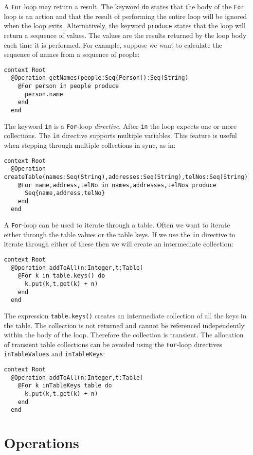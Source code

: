 \documentclass{article}
\begin{document}
A {\tt For} loop may return a result. The keyword {\tt do} states that the body of the
{\tt For} loop is an action and that the result of performing the entire loop will be
ignored when the loop exits. Alternatively, the keyword {\tt produce} states that the
loop will return a sequence of values. The values are the results returned by the loop
body each time it is performed. For example, suppose we want to calculate the sequence
of names from a sequence of people:
\begin{verbatim}
context Root
  @Operation getNames(people:Seq(Person)):Seq(String)
    @For person in people produce 
      person.name 
    end
  end
\end{verbatim}
The keyword {\tt in} is a {\tt For}-loop {\it directive}. After {\tt in} the loop
expects one or more collections. The {\tt in} directive supports multiple variables.
This feature is useful when stepping through multiple collections in sync, as in:
\begin{verbatim}
context Root
  @Operation createTable(names:Seq(String),addresses:Seq(String),telNos:Seq(String))
    @For name,address,telNo in names,addresses,telNos produce
      Seq{name,address,telNo}
    end
  end
\end{verbatim}
A {\tt For}-loop can be used to iterate through a table. Often we want to iterate
either through the table values or the table keys. If we use the {\tt in}
directive to iterate through either of these then we will create an intermediate
collection:
\begin{verbatim}
context Root
  @Operation addToAll(n:Integer,t:Table)
    @For k in table.keys() do
      k.put(k,t.get(k) + n)
    end
  end
\end{verbatim}
The expression {\tt table.keys()} creates an intermediate collection of all the keys
in the table. The collection is not returned and cannot be referenced independently
within the body of the loop. Therefore the collection is transient. The allocation of 
transient table collections can be avoided using the {\tt For}-loop directives 
{\tt inTableValues} and {\tt inTableKeys}:
\begin{verbatim}
context Root
  @Operation addToAll(n:Integer,t:Table)
    @For k inTableKeys table do
      k.put(k,t.get(k) + n)
    end
  end
\end{verbatim}
            
\section{Operations}
\end{document}
